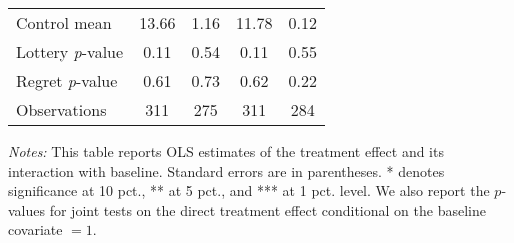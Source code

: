 \begin{table}[htbp]
{\begin{threeparttable}
\begin{tabular}{l*{4}{c}}
Control mean    &    13.66         &     1.16         &    11.78         &     0.12         \\
Lottery \emph{p}-value&     0.11         &     0.54         &     0.11         &     0.55         \\
Regret \emph{p}-value&     0.61         &     0.73         &     0.62         &     0.22         \\
Observations    &      311         &      275         &      311         &      284         \\
\bottomrule \end{tabular} \begin{tablenotes}[flushleft] \footnotesize \item \emph{Notes:} This table reports OLS estimates of the treatment effect and its interaction with baseline. Standard errors are in parentheses. * denotes significance at 10 pct., ** at 5 pct., and *** at 1 pct. level. We also report the \(p\)-values for joint tests on the direct treatment effect conditional on the baseline covariate $= 1$. \end{tablenotes} \end{threeparttable} } \end{table}

